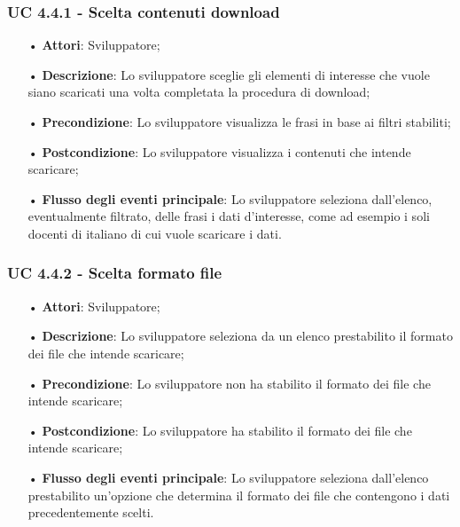 \subsubsection{UC 4.4.1 - Scelta contenuti download}
\begin{itemize}
\item[•]\textbf{Attori}: Sviluppatore;
\item[•]\textbf{Descrizione}: Lo sviluppatore sceglie gli elementi di interesse che vuole siano scaricati una volta completata la procedura di download;
\item[•]\textbf{Precondizione}: Lo sviluppatore visualizza le frasi in base ai filtri stabiliti;
\item[•]\textbf{Postcondizione}:  Lo sviluppatore visualizza i contenuti che intende scaricare;
\item[•]\textbf{Flusso degli eventi principale}:  Lo sviluppatore seleziona dall'elenco, eventualmente filtrato, delle frasi i dati d'interesse, come ad esempio i soli docenti di italiano di cui vuole scaricare i dati.
\end{itemize}

\subsubsection{UC 4.4.2 - Scelta formato file}
\begin{itemize}
\item[•]\textbf{Attori}: Sviluppatore;
\item[•]\textbf{Descrizione}:  Lo sviluppatore seleziona da un elenco prestabilito il formato dei file che intende scaricare;
\item[•]\textbf{Precondizione}: Lo sviluppatore non ha stabilito il formato dei file che intende scaricare;
\item[•]\textbf{Postcondizione}:  Lo sviluppatore ha stabilito il formato dei file che intende scaricare;
\item[•]\textbf{Flusso degli eventi principale}:  Lo sviluppatore seleziona dall'elenco prestabilito un'opzione che determina il formato dei file che contengono i dati precedentemente scelti.
\end{itemize}


